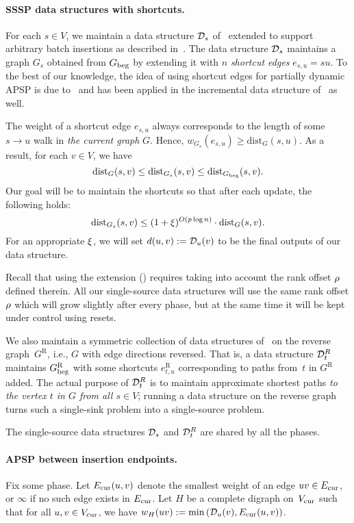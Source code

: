 \documentclass[11pt,letterpaper]{article}
\theoremstyle{plain}
\renewcommand{\O}{O}
\newcommand{\dist}{\mathrm{dist}}
\newcommand{\wei}{w}
\newcommand{\rev}[1]{#1^{\textrm{R}}}
\begin{document}
\paragraph{SSSP data structures with shortcuts.}
For each $s\in V$, we maintain a data structure $\mathcal{D}_s$ of~ extended to support
arbitrary batch insertions as described in~.
The data structure $\mathcal{D}_s$ maintains a graph $G_s$ obtained from $G_{\mathrm{beg}}$ by extending
it with $n$ \emph{shortcut edges} $e_{s,u}=su$.
To the best of our knowledge, the idea of using shortcut edges for partially dynamic APSP is due to~\cite{Bernstein16} and has been applied in the incremental data structure of~\cite{KarczmarzL19} as well.

The weight of a shortcut edge $e_{s,u}$
always corresponds to the length of some $s\to u$ walk in \emph{the current graph} $G$.
Hence, $\wei_{G_s}(e_{s,u})\geq \dist_G(s,u)$.
As a result, for each $v\in V$, we have
\[ \dist_{G}(s,v)\leq \dist_{G_s}(s,v)\leq \dist_{\Gbeg}(s,v). \]
Our goal will be to maintain the shortcuts so that after each update, the following holds:
\[ \dist_{G_s}(s,v)\leq (1+\epsp)^{\O(p\log{n})}\cdot \dist_G(s,v). \]
For an appropriate $\xi$, we will set $d(u,v):=\mathcal{D}_u(v)$ to be the final outputs of our data structure.

Recall that using the extension () requires taking into account the rank offset $\rho$ defined therein.
All our single-source data structures will use the same rank offset $\rho$ which will grow slightly after every phase,
but at the same time it will be kept under control using resets.

We also maintain a symmetric collection of data structures of~ on the reverse
graph~$\rev{G}$, i.e., $G$ with edge directions reversed. That is, a data structure $\mathcal{D}^{R}_t$ maintains $\rev{\Gbeg}$ with some shortcuts $\rev{e_{t,u}}$
corresponding to paths from~$t$ in $\rev{G}$ added.
The actual purpose of $\mathcal{D}^{R}_t$ is to maintain approximate shortest paths \emph{to the vertex $t$ in $G$ from all $s\in V$};
running a data structure on the reverse graph turns such a single-sink problem into a single-source problem.

The single-source data structures $\mathcal{D}_s$ and $\mathcal{D}^{R}_t$ are shared by all the phases.


\paragraph{APSP between insertion endpoints.} Fix some phase.
Let $E_{\mathrm{cur}}(u,v)$ denote the smallest weight of an edge $uv\in E_{\mathrm{cur}}$, or $\infty$ if no such edge exists in $E_{\mathrm{cur}}$.
Let $H$ be a complete digraph on~$V_{\mathrm{cur}}$ such that
for all $u,v\in V_{\mathrm{cur}}$, we have $\wei_H(uv):=\min\left(\dsfrom_u(v),\Ecur(u,v)\right)$.
\end{document}
